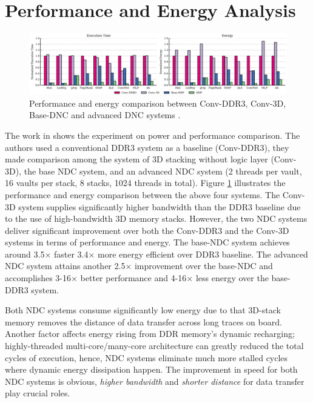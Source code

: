 \documentclass[letterpaper, 11pt, conference, margin=1in]{ieeeconf}   %
\begin{document}
\section{Performance and Energy Analysis}
\begin{figure}[h]
    \centering
    \includegraphics[width=\textwidth, scale=0.5]{figures/comparison_performance_energy.png}
    \caption{Performance and energy comparison between Conv-DDR3, Conv-3D, Base-DNC and advanced DNC systems \cite{Gao2015}.}
    \label{fig:comp-power-energy}
\end{figure}
The work in \cite{Gao2015} shows the experiment on power and performance comparison. The authors used a conventional DDR3 system as a baseline (Conv-DDR3), they made comparison among the system of 3D stacking without logic layer (Conv-3D), the base NDC system, and an advanced NDC system (2 threads per vault, 16 vaults per stack, 8 stacks, 1024 threads in total). Figure \ref{fig:comp-power-energy} illustrates the performance and energy comparison between the above four systems. The Conv-3D system supplies significantly higher bandwidth than the DDR3 baseline due to the use of high-bandwidth 3D memory stacks. However, the two NDC systems deliver significant improvement over both the Conv-DDR3 and the Conv-3D systems in terms of performance and energy. The base-NDC system achieves around 3.5$\times$ faster 3.4$\times$ more energy efficient over DDR3 baseline. The advanced NDC system attains another 2.5$\times$ improvement over the base-NDC and accomplishes 3-16$\times$ better performance and 4-16$\times$ less energy over the base-DDR3 system.

Both NDC systems consume significantly low energy due to that 3D-stack memory removes the distance of data transfer across long traces on board. Another factor affects energy rising from DDR memory's dynamic recharging; highly-threaded multi-core/many-core architecture can greatly reduced the total cycles of execution, hence, NDC systems eliminate much more stalled cycles where dynamic energy dissipation happen. The improvement in speed for both NDC systems is obvious, \textit{higher bandwidth} and \textit{shorter distance} for data transfer play crucial roles.
\end{document}
